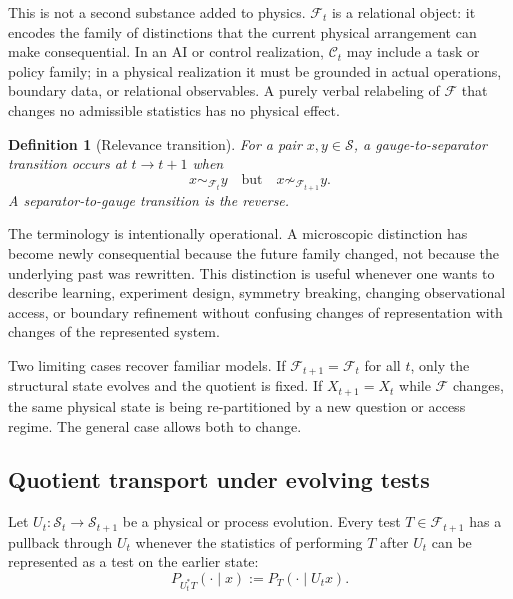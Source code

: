 \documentclass[11pt]{article}
\newtheorem{definition}{Definition}
\newcommand{\F}{\mathcal F}
\newcommand{\Sspace}{\mathcal S}
\begin{document}
This is not a second substance added to physics. $\F_t$ is a relational object: it encodes the family of distinctions that the current physical arrangement can make consequential. In an AI or control realization, $\mathcal C_t$ may include a task or policy family; in a physical realization it must be grounded in actual operations, boundary data, or relational observables. A purely verbal relabeling of $\F$ that changes no admissible statistics has no physical effect.

\begin{definition}[Relevance transition]
For a pair $x,y\in\Sspace$, a gauge-to-separator transition occurs at $t\to t+1$ when
\begin{equation}
  x\sim_{\F_t}y
  \quad\text{but}\quad
  x\not\sim_{\F_{t+1}}y.
  \label{eq:relevance-bifurcation}
\end{equation}
A separator-to-gauge transition is the reverse.
\end{definition}

The terminology is intentionally operational. A microscopic distinction has become newly consequential because the future family changed, not because the underlying past was rewritten. This distinction is useful whenever one wants to describe learning, experiment design, symmetry breaking, changing observational access, or boundary refinement without confusing changes of representation with changes of the represented system.

Two limiting cases recover familiar models. If $\F_{t+1}=\F_t$ for all $t$, only the structural state evolves and the quotient is fixed. If $X_{t+1}=X_t$ while $\F$ changes, the same physical state is being re-partitioned by a new question or access regime. The general case allows both to change.

\subsection{Quotient transport under evolving tests}

Let $U_t:\Sspace_t\to\Sspace_{t+1}$ be a physical or process evolution. Every test $T\in\F_{t+1}$ has a pullback through $U_t$ whenever the statistics of performing $T$ after $U_t$ can be represented as a test on the earlier state:
\begin{equation}
  P_{U_t^{\ast}T}(\cdot\mid x)
  :=
  P_T(\cdot\mid U_t x).
  \label{eq:test-pullback}
\end{equation}
\end{document}
